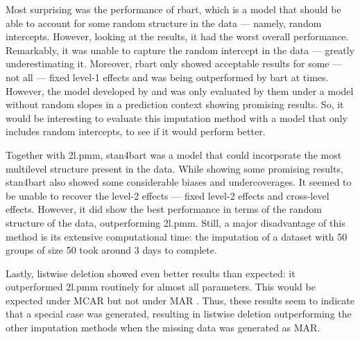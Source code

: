 \documentclass[10pt, a4paper, titlepage]{article}
\begin{document}
Most surprising was the performance of rbart, which is a model that should be able to account for some random structure in the data --- namely, random intercepts. However, looking at the results, it had the worst overall performance. Remarkably, it was unable to capture the random intercept in the data --- greatly underestimating it. Moreover, rbart only showed acceptable results for some --- not all --- fixed level-1 effects and was being outperformed by bart at times. However, the model developed by \citet{wagner2020,tan2016} and \citet{dorie2024} was only evaluated by them under a model without random slopes in a prediction context showing promising results. So, it would be interesting to evaluate this imputation method with a model that only includes random intercepts, to see if it would perform better. %

Together with 2l.pmm, stan4bart was a model that could incorporate the most multilevel structure present in the data. While showing some promising results, stan4bart also showed some considerable biases and undercoverages. It seemed to be unable to recover the level-2 effects --- fixed level-2 effects and cross-level effects. However, it did show the best performance in terms of the random structure of the data, outperforming 2l.pmm. Still, a major disadvantage of this method is its extensive computational time: the imputation of a dataset with 50 groups of size 50 took around 3 days to complete. %

Lastly, listwise deletion showed even better results than expected: it outperformed 2l.pmm routinely for almost all parameters. This would be expected under MCAR but not under MAR \citep{buurenFlexibleImputationMissing2018,enders2018a,peeters2015,austin2021,carpenter2013,little2002,grund2018,ludtke2017,grund2021,schouten2021}. Thus, these results seem to indicate that a special case was generated, resulting in listwise deletion outperforming the other imputation methods when the missing data was generated as MAR. %
\end{document}
